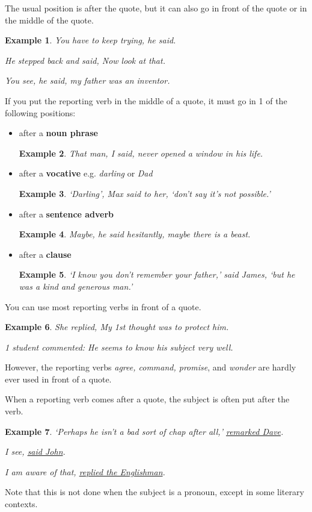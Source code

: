 \documentclass[oneside]{book}
\numberwithin{equation}{section}
\newtheorem{example}{Example}[section]
\begin{document}
The usual position is after the quote, but it can also go in front of the quote or in the middle of the quote.
\begin{example}
    You have to keep trying, he said.
    
    He stepped back and said, Now look at that.
    
    You see, he said, my father was an inventor.
\end{example}
%
\noindent{} If you put the reporting verb in the middle of a quote, it must go in 1 of the following positions:
\begin{itemize}
    \item after a \textbf{noun phrase}
    \begin{example}
        That man, I said, never opened a window in his life.
    \end{example}
    \item after a \textbf{vocative} e.g. \textit{darling} or \textit{Dad}
    \begin{example}
        `Darling', Max said to her, `don't say it's not possible.'
    \end{example}
    \item after a \textbf{sentence adverb}
    \begin{example}
        Maybe, he said hesitantly, maybe there is a beast.
    \end{example}
    \item after a \textbf{clause}
    \begin{example}
        `I know you don't remember your father,' said James, `but he was a kind and generous man.'
    \end{example}
\end{itemize}
%
\noindent{} You can use most reporting verbs in front of a quote.
\begin{example}
    She replied, My 1st thought was to protect him.
    
    1 student commented: He seems to know his subject very well.
\end{example}
However, the reporting verbs \textit{agree, command, promise}, and \textit{wonder} are hardly ever used in front of a quote.

%
\noindent{} When a reporting verb comes after a quote, the subject is often put after the verb.
\begin{example}
    `Perhaps he isn't a bad sort of chap after all,' \underline{remarked Dave}.
    
    I see, \underline{said John}.
    
    I am aware of that, \underline{replied the Englishman}.
\end{example}
Note that this is not done when the subject is a pronoun, except in some literary contexts.
\end{document}

